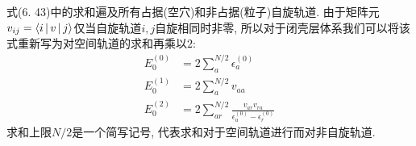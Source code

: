式(6.
43)中的求和遍及所有占据(空穴)和非占据(粒子)自旋轨道. 
由于矩阵元$v_{ij} = \Braket{i|v|j}$仅当自旋轨道$i,j$自旋相同时非零, 
所以对于闭壳层体系我们可以将该式重新写为对空间轨道的求和再乘以$2$:
\begin{subequations}
	\begin{align}
	E_0^{(0)} & = 2\sum_a^{N/2}\epsilon_a^{(0)}\\
	E_0^{(1)} & = 2\sum_a^{N/2}v_{aa} \\
	E_0^{(2)} & = 2\sum_{ar}^{N/2}\frac{v_{ar}v_{ra}}{\epsilon_a^{(0)} - \epsilon_r^{(0)}}
	\end{align}
\end{subequations}
求和上限$N/2$是一个简写记号, 
代表求和对于空间轨道进行而对非自旋轨道.

